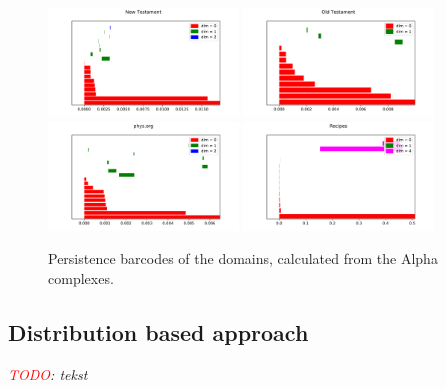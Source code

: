 \documentclass[12pt,a4paper]{amsart}
\begin{document}
\begin{figure}
  \centering
  \includegraphics[width=0.45\textwidth]{../plots/barcodes/bible-new-alpha}
  \includegraphics[width=0.45\textwidth]{../plots/barcodes/bible-old-alpha}
  \includegraphics[width=0.45\textwidth]{../plots/barcodes/phys-alpha}
  \includegraphics[width=0.45\textwidth]{../plots/barcodes/recipes-alpha}
  \caption{Persistence barcodes of the domains, calculated from the Alpha
    complexes.}
  \label{fig:barcode:alpha}
\end{figure}

\subsection{Distribution based approach}

\emph{\textcolor{red}{TODO}: tekst}
\end{document}

